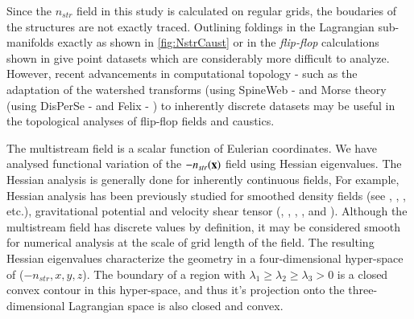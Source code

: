 Since the $n_{str}$ field in this study is calculated on regular grids, the boudaries of the structures are not exactly traced. Outlining foldings in the Lagrangian sub-manifolds exactly as shown in \autoref{fig:NstrCaust} or in the {\it flip-flop} calculations shown in \cite{Shandarin2016} give point datasets which are considerably more difficult to analyze. However, recent advancements in computational topology - such as the adaptation of the watershed transforms (using SpineWeb -\citealt{Aragon-Calvo2008} and Morse theory (using DisPerSe - \citealt{Sousbie2011e} and Felix - \citealt{Shivshankar2015a}) to inherently discrete datasets may be useful in the topological analyses of flip-flop fields and caustics.


The multistream field is a scalar function of Eulerian coordinates. We have analysed functional variation of the $-n_{str}(\bf{x})$ field using Hessian eigenvalues. The Hessian analysis is generally done for inherently continuous fields, For example, Hessian analysis has been previously studied for smoothed density fields (see \citealt{Sousbie2008c}, \citealt{Aragon-Calvo2007}, \citealt{Aragon-Calvo2010}, \citealt{Cautun2014a} etc.), gravitational potential and velocity shear tensor (\citealt{Hoffman2012a}, \citealt{Libeskind2013}, \citealt{Hahn2007}, \citealt{Forero-Romero2009a}, \citealt{Hoffman2012a} and \citealt{Cautun2014a}). Although the multistream field has discrete values by definition, it may be considered smooth for numerical analysis at the scale of grid length of the field. The resulting Hessian eigenvalues characterize the geometry in a four-dimensional hyper-space of ($-n_{str}, x, y, z$). The boundary of a region with $\lambda_1 \geq \lambda_2 \geq \lambda_3 > 0$ is a closed convex contour in this hyper-space, and thus it's projection onto the three-dimensional Lagrangian space is also closed and convex. 

